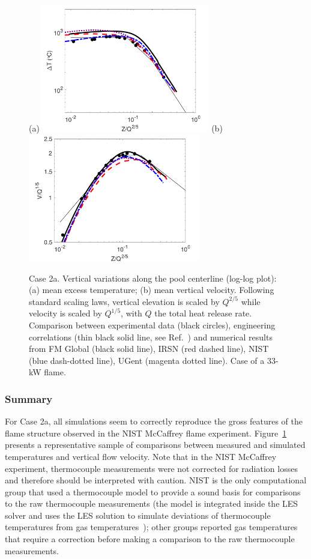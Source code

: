 \begin{figure}
\centering
(a)\includegraphics[height=2.2in]{Figures/Case2-Fig1a.pdf}
(b)\includegraphics[height=2.2in]{Figures/Case2-Fig1b.pdf}
\caption{Case 2a. Vertical variations along the pool centerline (log-log plot): (a) mean excess temperature; (b) mean vertical velocity. Following standard scaling laws, vertical elevation is scaled by ${Q}^{2/5}$ while velocity is scaled by ${Q}^{1/5}$, with $Q$ the total heat release rate. Comparison between experimental data (black circles), engineering correlations (thin black solid line, see Ref.~\cite{Case2a_EXP}) and numerical results from FM Global (black solid line), IRSN (red dashed line), NIST (blue dash-dotted line), UGent (magenta dotted line). Case of a 33-kW flame.}
\label{fig:Case2-Fig1}
\end{figure}

\subsubsection{Summary}

For Case 2a, all simulations seem to correctly reproduce the gross features of the flame structure observed in the NIST McCaffrey flame experiment. Figure~\ref{fig:Case2-Fig1} presents a representative sample of comparisons between measured and simulated temperatures and vertical flow velocity. Note that in the NIST McCaffrey experiment, thermocouple measurements were not corrected for radiation losses and therefore should be interpreted with caution. NIST is the only computational group that used a thermocouple model to provide a sound basis for comparisons to the raw thermocouple measurements (the model is integrated inside the LES solver and uses the LES solution to simulate deviations of thermocouple temperatures from gas temperatures~\cite{FDS_Math_Guide}); other groups reported gas temperatures that require a correction before making a comparison to the raw thermocouple measurements.

